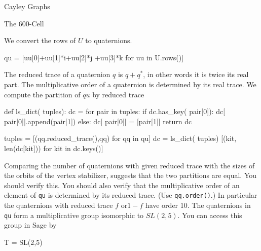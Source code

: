 \begin{chap}{Cayley Graphs}
\begin{sect}{The 600-Cell}
\begin{sagecode}
\begin{sageoutput}
\end{sageoutput}
\end{sagecode}
%
\begin{para}
We convert the rows of $U$ to quaternions.
\end{para}
%
\begin{sagecode}
\begin{sageinput}
qu = [uu[0]+uu[1]*i+uu[2]*j +uu[3]*k for uu in U.rows()]
\end{sageinput}
\end{sagecode}
%
\begin{para}
The reduced trace of a quaternion $q$ is $q+q^*$, in other words it is
twice its real part. The multiplicative order of a quaternion is determined
by its real trace. We compute the partition of $qu$ by reduced trace
\end{para}
%
\begin{sagecode}
\begin{sageinput}
def ls_dict( tuples):
    dc = {} 
    for pair in tuples:
        if dc.has_key( pair[0]):
            dc[ pair[0]].append(pair[1])
        else:
            dc[ pair[0]] = [pair[1]]
    return dc
\end{sageinput}
\end{sagecode}
%
\begin{sagecode}
\begin{sageinput}
tuples = [(qq.reduced_trace(),qq) for qq in qu]
dc = ls_dict( tuples)
[(kit, len(dc[kit])) for kit in dc.keys()]
\end{sageinput}
\begin{sageoutput}
[(0, 30), (1, 20), (2, 1), (-f, 12), (-f + 1, 12), 
(f - 1, 12), (f, 12), (-2, 1), (-1, 20)]
\end{sageoutput}
\end{sagecode}
%
\begin{para}
Comparing the number of quaternions with given reduced trace with the
sizes of the orbits of the vertex stabilizer, suggests that the two partitions
are equal. You should verify this. You should also verify that the
multiplicative order of an element of \verb|qu| is determined by its 
reduced trace. (Use \verb|qq.order()|.) In particular the quaternions
with reduced trace $f$ or$1-f$ have order 10. The quaternions in
\verb|qu| form a multiplicative group isomorphic to $SL(2,5)$.
You can access this group in Sage by
\end{para}
%
\begin{sagecode}
\begin{sageinput}
T = SL(2,5)

\end{sageinput}
\end{sagecode}
\end{sect}
\end{chap}
